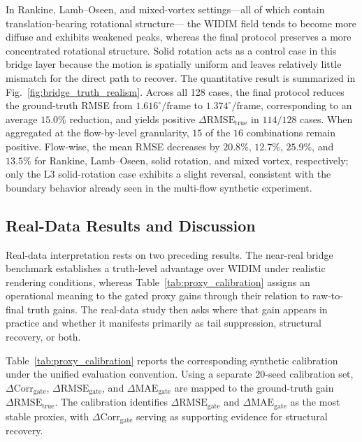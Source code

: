 \documentclass[lettersize,journal]{IEEEtran}
\begin{document}
In Rankine, Lamb--Oseen, and mixed-vortex settings---all of which contain translation-bearing rotational structure---
the WIDIM field tends to become more diffuse and exhibits weakened peaks,
whereas the final protocol preserves a more concentrated rotational structure.
Solid rotation acts as a control case in this bridge layer because the motion is spatially uniform and leaves relatively little mismatch for the direct path to recover.
The quantitative result is summarized in Fig.~\ref{fig:bridge_truth_realism}.
Across all 128 cases,
the final protocol reduces the ground-truth RMSE from $1.616^\circ/\mathrm{frame}$ to $1.374^\circ/\mathrm{frame}$,
corresponding to an average $15.0\%$ reduction,
and yields positive $\Delta\mathrm{RMSE}_{\mathrm{true}}$ in $114/128$ cases.
When aggregated at the flow-by-level granularity,
$15$ of the $16$ combinations remain positive.
Flow-wise, the mean RMSE decreases by $20.8\%$, $12.7\%$, $25.9\%$, and $13.5\%$
for Rankine, Lamb--Oseen, solid rotation, and mixed vortex, respectively;
only the L3 solid-rotation case exhibits a slight reversal,
consistent with the boundary behavior already seen in the multi-flow synthetic experiment.

\subsection{Real-Data Results and Discussion}

Real-data interpretation rests on two preceding results.
The near-real bridge benchmark establishes a truth-level advantage over WIDIM under realistic rendering conditions, whereas Table~\ref{tab:proxy_calibration} assigns an operational meaning to the gated proxy gains through their relation to raw-to-final truth gains.
The real-data study then asks where that gain appears in practice and whether it manifests primarily as tail suppression, structural recovery, or both.

Table~\ref{tab:proxy_calibration} reports the corresponding synthetic calibration under the unified evaluation convention.
Using a separate 20-seed calibration set, $\Delta\mathrm{Corr}_{\mathrm{gate}}$, $\Delta\mathrm{RMSE}_{\mathrm{gate}}$, and $\Delta\mathrm{MAE}_{\mathrm{gate}}$ are mapped to the ground-truth gain $\Delta\mathrm{RMSE}_{\mathrm{true}}$.
The calibration identifies $\Delta\mathrm{RMSE}_{\mathrm{gate}}$ and $\Delta\mathrm{MAE}_{\mathrm{gate}}$ as the most stable proxies, with $\Delta\mathrm{Corr}_{\mathrm{gate}}$ serving as supporting evidence for structural recovery.
\end{document}
